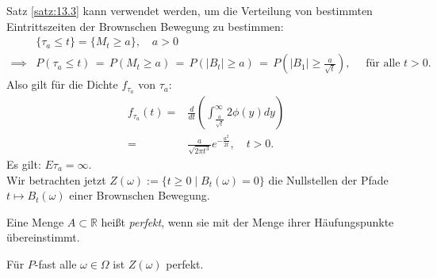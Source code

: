 \documentclass[a4paper,twoside,DIV15,BCOR12mm]{scrbook}
\begin{document}
\begin{bemerkung}
Satz \ref{satz:13.3} kann verwendet werden, um die Verteilung von bestimmten Eintrittszeiten der Brownschen Bewegung zu bestimmen: \\
\begin{align*}
&\{\tau_a\leq t\}=\{M_t\geq a\},\quad a>0  \\
\implies &P(\tau_a\leq t)\,=\,P(M_t\geq a)\,=\,P(\vert B_t\vert\geq a)\,=\,P(\vert B_1\vert\geq\frac{a}{\sqrt{t}}), \quad\text{ für alle }t>0.
\end{align*}
Also gilt für die Dichte $f_{\tau_a}$ von $\tau_a$:
\begin{align*}
  f_{\tau_a}(t)=&\frac{d}{dt}\left(\int_{\frac{a}{\sqrt{t}}}^\infty2\phi(y)dy\right) \\
=&\frac{a}{\sqrt{2\pi t^3}}e^{-\frac{a^2}{2t}},\quad t>0.
\end{align*}
Es gilt: $E\tau_a=\infty$.\\
Wir betrachten jetzt $Z(\omega):=\{t\geq0\mid B_t(\omega)=0\}$ die Nullstellen der Pfade $t\mapsto B_t(\omega)$ einer Brownschen Bewegung.
\end{bemerkung}
\begin{definition}
Eine Menge $A\subset\mathbb R$ heißt \emph{perfekt}, wenn sie mit der Menge ihrer Häufungspunkte übereinstimmt.
\end{definition}
\begin{satz}
\label{satz:13.4}
    Für $P$-fast alle $\omega\in\Omega$ ist $Z(\omega)$ perfekt.
\end{satz}
\end{document}
